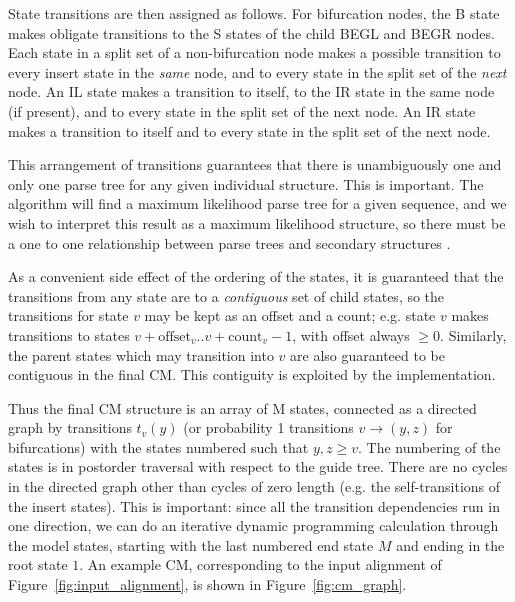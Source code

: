 \documentclass[11pt]{article}
\begin{document}
State transitions are then assigned as follows. For bifurcation nodes,
the B state makes obligate transitions to the S states of the child
BEGL and BEGR nodes. Each state in a split set of a non-bifurcation
node makes a possible transition to every insert state in the
\emph{same} node, and to every state in the split set of the
\emph{next} node. An IL state makes a transition to itself, to the IR
state in the same node (if present), and to every state in the split
set of the next node. An IR state makes a transition to itself and to
every state in the split set of the next node.

This arrangement of transitions guarantees that there is unambiguously
one and only one parse tree for any given individual structure. This
is important. The algorithm will find a maximum likelihood parse tree
for a given sequence, and we wish to interpret this result as a
maximum likelihood structure, so there must be a one to one
relationship between parse trees and secondary structures
\cite{Giegerich00}.

As a convenient side effect of the ordering of the states, it is
guaranteed that the transitions from any state are to a
\emph{contiguous} set of child states, so the transitions for state
$v$ may be kept as an offset and a count; e.g. state $v$ makes
transitions to states $v+\mbox{offset}_v..v+\mbox{count}_v-1$, with offset
always $\geq 0$.  Similarly, the parent states which may transition
into $v$ are also guaranteed to be contiguous in the final CM. This
contiguity is exploited by the implementation.

Thus the final CM structure is an array of M states, connected as a
directed graph by transitions $t_v(y)$ (or probability 1 transitions
$v \rightarrow (y,z)$ for bifurcations) with the states numbered such
that $y,z \geq v$. The numbering of the states is in postorder
traversal with respect to the guide tree. There are no cycles in the
directed graph other than cycles of zero length (e.g. the
self-transitions of the insert states). This is important: since all
the transition dependencies run in one direction, we can do an
iterative dynamic programming calculation through the model states,
starting with the last numbered end state $M$ and ending in the root
state $1$.  An example CM, corresponding to the input alignment of
Figure~\ref{fig:input_alignment}, is shown in
Figure~\ref{fig:cm_graph}.
\end{document}
